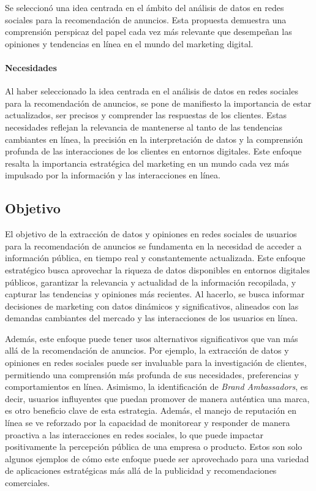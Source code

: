 \documentclass[
  letterpaper,
  DIV=11,
  numbers=noendperiod]{scrartcl}
\let\oldparagraph\paragraph
\renewcommand{\paragraph}[1]{\oldparagraph{#1}\mbox{}}
\begin{document}
Se seleccionó una idea centrada en el ámbito del análisis de datos en
redes sociales para la recomendación de anuncios. Esta propuesta
demuestra una comprensión perspicaz del papel cada vez más relevante que
desempeñan las opiniones y tendencias en línea en el mundo del marketing
digital.

\paragraph{Necesidades}\label{necesidades}

Al haber seleccionado la idea centrada en el análisis de datos en redes
sociales para la recomendación de anuncios, se pone de manifiesto la
importancia de estar actualizados, ser precisos y comprender las
respuestas de los clientes. Estas necesidades reflejan la relevancia de
mantenerse al tanto de las tendencias cambiantes en línea, la precisión
en la interpretación de datos y la comprensión profunda de las
interacciones de los clientes en entornos digitales. Este enfoque
resalta la importancia estratégica del marketing en un mundo cada vez
más impulsado por la información y las interacciones en línea.

\subsection{Objetivo}\label{objetivo}

El objetivo de la extracción de datos y opiniones en redes sociales de
usuarios para la recomendación de anuncios se fundamenta en la necesidad
de acceder a información pública, en tiempo real y constantemente
actualizada. Este enfoque estratégico busca aprovechar la riqueza de
datos disponibles en entornos digitales públicos, garantizar la
relevancia y actualidad de la información recopilada, y capturar las
tendencias y opiniones más recientes. Al hacerlo, se busca informar
decisiones de marketing con datos dinámicos y significativos, alineados
con las demandas cambiantes del mercado y las interacciones de los
usuarios en línea.

Además, este enfoque puede tener usos alternativos significativos que
van más allá de la recomendación de anuncios. Por ejemplo, la extracción
de datos y opiniones en redes sociales puede ser invaluable para la
investigación de clientes, permitiendo una comprensión más profunda de
sus necesidades, preferencias y comportamientos en línea. Asimismo, la
identificación de \emph{Brand Ambassadors}, es decir, usuarios
influyentes que puedan promover de manera auténtica una marca, es otro
beneficio clave de esta estrategia. Además, el manejo de reputación en
línea se ve reforzado por la capacidad de monitorear y responder de
manera proactiva a las interacciones en redes sociales, lo que puede
impactar positivamente la percepción pública de una empresa o producto.
Estos son solo algunos ejemplos de cómo este enfoque puede ser
aprovechado para una variedad de aplicaciones estratégicas más allá de
la publicidad y recomendaciones comerciales.
\end{document}
